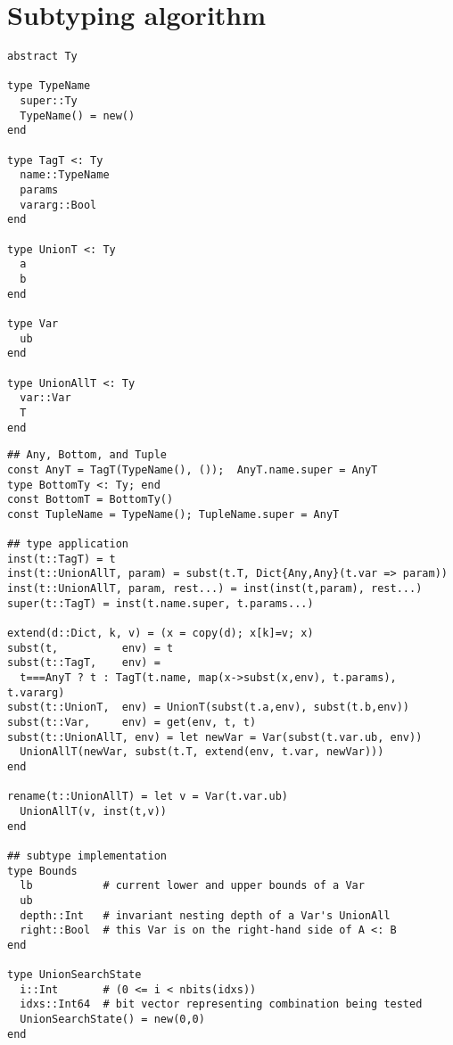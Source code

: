 \chapter{Subtyping algorithm}

\begin{singlespace}
\begin{multicols}{2}
\begin{lstlisting}[style=customjulia]
abstract Ty

type TypeName
  super::Ty
  TypeName() = new()
end

type TagT <: Ty
  name::TypeName
  params
  vararg::Bool
end

type UnionT <: Ty
  a
  b
end

type Var
  ub
end

type UnionAllT <: Ty
  var::Var
  T
end
\end{lstlisting}
\end{multicols}

\begin{lstlisting}[style=customjulia]
## Any, Bottom, and Tuple
const AnyT = TagT(TypeName(), ());  AnyT.name.super = AnyT
type BottomTy <: Ty; end
const BottomT = BottomTy()
const TupleName = TypeName(); TupleName.super = AnyT

## type application
inst(t::TagT) = t
inst(t::UnionAllT, param) = subst(t.T, Dict{Any,Any}(t.var => param))
inst(t::UnionAllT, param, rest...) = inst(inst(t,param), rest...)
super(t::TagT) = inst(t.name.super, t.params...)

extend(d::Dict, k, v) = (x = copy(d); x[k]=v; x)
subst(t,          env) = t
subst(t::TagT,    env) =
  t===AnyT ? t : TagT(t.name, map(x->subst(x,env), t.params), t.vararg)
subst(t::UnionT,  env) = UnionT(subst(t.a,env), subst(t.b,env))
subst(t::Var,     env) = get(env, t, t)
subst(t::UnionAllT, env) = let newVar = Var(subst(t.var.ub, env))
  UnionAllT(newVar, subst(t.T, extend(env, t.var, newVar)))
end

rename(t::UnionAllT) = let v = Var(t.var.ub)
  UnionAllT(v, inst(t,v))
end

## subtype implementation
type Bounds
  lb           # current lower and upper bounds of a Var
  ub
  depth::Int   # invariant nesting depth of a Var's UnionAll
  right::Bool  # this Var is on the right-hand side of A <: B
end

type UnionSearchState
  i::Int       # (0 <= i < nbits(idxs))
  idxs::Int64  # bit vector representing combination being tested
  UnionSearchState() = new(0,0)
end


\end{lstlisting}
\end{singlespace}
